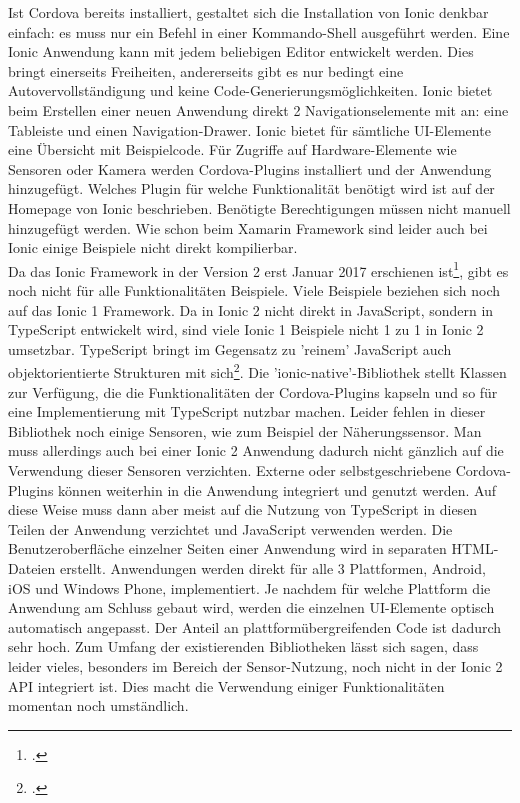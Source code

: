 Ist Cordova bereits installiert, gestaltet sich die Installation von Ionic denkbar einfach: es muss nur ein Befehl in einer Kommando-Shell ausgeführt werden. Eine Ionic  Anwendung kann mit jedem beliebigen Editor entwickelt werden. Dies bringt einerseits Freiheiten, andererseits gibt es nur bedingt eine Autovervollständigung und keine Code-Generierungsmöglichkeiten. Ionic bietet beim Erstellen einer neuen Anwendung direkt 2 Navigationselemente mit an: eine Tableiste und einen Navigation-Drawer. Ionic bietet für sämtliche UI-Elemente eine Übersicht mit Beispielcode. Für Zugriffe auf Hardware-Elemente wie Sensoren oder Kamera werden Cordova-Plugins installiert und der Anwendung hinzugefügt. Welches Plugin für welche Funktionalität benötigt wird ist auf der Homepage von Ionic beschrieben. Benötigte Berechtigungen müssen nicht manuell hinzugefügt werden. Wie schon beim Xamarin Framework sind leider auch bei Ionic einige Beispiele nicht direkt kompilierbar.
\\
Da das Ionic Framework in der Version 2 erst Januar 2017 erschienen ist\footcite{IonicHomepage}, gibt es noch nicht für alle Funktionalitäten Beispiele. Viele Beispiele beziehen sich noch auf das Ionic 1 Framework. Da in Ionic 2 nicht direkt in JavaScript, sondern in TypeScript entwickelt wird, sind viele Ionic 1 Beispiele nicht 1 zu 1 in Ionic 2 umsetzbar. TypeScript bringt im Gegensatz zu 'reinem' JavaScript auch objektorientierte Strukturen mit sich\footcite{TypeScript}. Die 'ionic-native'-Bibliothek stellt Klassen zur Verfügung, die die Funktionalitäten der Cordova-Plugins kapseln und so für eine Implementierung mit TypeScript nutzbar machen. Leider fehlen in dieser Bibliothek noch einige Sensoren, wie zum Beispiel der Näherungssensor. Man muss allerdings auch bei einer Ionic 2 Anwendung dadurch nicht gänzlich auf die Verwendung dieser Sensoren verzichten. Externe oder selbstgeschriebene Cordova-Plugins können weiterhin in die Anwendung integriert und genutzt werden. Auf diese Weise muss dann aber meist auf die Nutzung von TypeScript in diesen Teilen der Anwendung verzichtet und JavaScript verwenden werden. Die Benutzeroberfläche einzelner Seiten einer Anwendung wird in separaten HTML-Dateien erstellt. Anwendungen werden direkt für alle 3 Plattformen, Android, iOS und Windows Phone, implementiert. Je nachdem für welche Plattform die Anwendung am Schluss gebaut wird, werden die einzelnen UI-Elemente optisch automatisch angepasst. Der Anteil an plattformübergreifenden Code ist dadurch sehr hoch. Zum Umfang der existierenden Bibliotheken lässt sich sagen, dass leider vieles, besonders im Bereich der Sensor-Nutzung, noch nicht in der Ionic 2 API integriert ist. Dies macht die Verwendung einiger Funktionalitäten momentan noch umständlich. 
